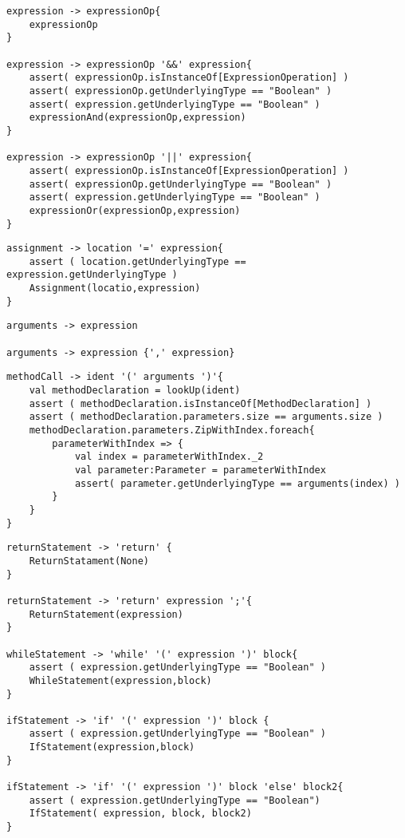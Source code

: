 \documentclass[12pt,letterpaper]{article}
\begin{document}
\begin{lstlisting}
expression -> expressionOp{
	expressionOp
}

expression -> expressionOp '&&' expression{
	assert( expressionOp.isInstanceOf[ExpressionOperation] )
	assert( expressionOp.getUnderlyingType == "Boolean" )
	assert( expression.getUnderlyingType == "Boolean" )
	expressionAnd(expressionOp,expression)
}

expression -> expressionOp '||' expression{
	assert( expressionOp.isInstanceOf[ExpressionOperation] )
	assert( expressionOp.getUnderlyingType == "Boolean" )
	assert( expression.getUnderlyingType == "Boolean" )
	expressionOr(expressionOp,expression)
}
\end{lstlisting}

\begin{lstlisting}
assignment -> location '=' expression{
	assert ( location.getUnderlyingType == expression.getUnderlyingType )
	Assignment(locatio,expression)
}
\end{lstlisting}

\begin{lstlisting}
arguments -> expression

arguments -> expression {',' expression}
\end{lstlisting}

\begin{lstlisting}
methodCall -> ident '(' arguments ')'{
	val methodDeclaration = lookUp(ident)
	assert ( methodDeclaration.isInstanceOf[MethodDeclaration] )
	assert ( methodDeclaration.parameters.size == arguments.size )
	methodDeclaration.parameters.ZipWithIndex.foreach{ 
		parameterWithIndex => {
			val index = parameterWithIndex._2
			val parameter:Parameter = parameterWithIndex
			assert( parameter.getUnderlyingType == arguments(index) )
		}
	}
}
\end{lstlisting}

\begin{lstlisting}
returnStatement -> 'return' {
	ReturnStatament(None)
}

returnStatement -> 'return' expression ';'{
	ReturnStatement(expression)
}

whileStatement -> 'while' '(' expression ')' block{
	assert ( expression.getUnderlyingType == "Boolean" )
	WhileStatement(expression,block)
}

ifStatement -> 'if' '(' expression ')' block {
	assert ( expression.getUnderlyingType == "Boolean" )
	IfStatement(expression,block)
}

ifStatement -> 'if' '(' expression ')' block 'else' block2{
	assert ( expression.getUnderlyingType == "Boolean")
	IfStatement( expression, block, block2)
}
\end{lstlisting}
\end{document}
